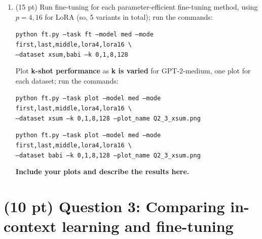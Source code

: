 \documentclass[12pt]{article}
\begin{document}
\begin{enumerate}
    \item (15 pt) Run fine-tuning for each parameter-efficient fine-tuning method, using $p=4,16$ for LoRA (so, 5 variants in total); run the commands:

    {\small \texttt{python ft.py --task ft --model med --mode first,last,middle,lora4,lora16 \textbackslash \\
    \phantom{asdf}--dataset xsum,babi --k 0,1,8,128}}

    Plot \textbf{k-shot performance} as \textbf{k is varied} for GPT-2-medium, one plot for each dataset; run the commands:

    {\small \texttt{python ft.py --task plot --model med --mode first,last,middle,lora4,lora16 \textbackslash \\
    \phantom{asdf}--dataset xsum --k 0,1,8,128 --plot\_name Q2\_3\_xsum.png}}

    {\small \texttt{python ft.py --task plot --model med --mode first,last,middle,lora4,lora16 \textbackslash \\
    \phantom{asdf}--dataset babi --k 0,1,8,128 --plot\_name Q2\_3\_xsum.png}}
    
    \textbf{\color{red}Include your plots and describe the results here.}

\end{enumerate}

\section*{(10 pt) Question 3: Comparing in-context learning and fine-tuning}
\end{document}
